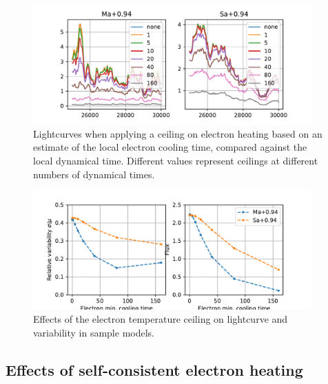 \begin{figure}
    \centering
    \includegraphics[width=0.95\textwidth]{figures/ctcut_lightcurves.pdf}
    \caption{Lightcurves when applying a ceiling on electron heating based on an estimate of the local electron cooling time, compared against the local dynamical time. Different values represent ceilings at different numbers of dynamical times.}
    \label{fig:my_label}
\end{figure}

\begin{figure}
    \centering
    \includegraphics[width=0.95\textwidth]{figures/ctcut_effects.pdf}
    \caption{Effects of the electron temperature ceiling on lightcurve and variability in sample models.}
    \label{fig:my_label}
\end{figure}








\subsection{Effects of self-consistent electron heating}

